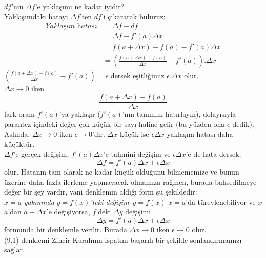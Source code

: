 $df$'nin $\varDelta f$'e yaklaşımı ne kadar iyidir?\\

Yaklaşımdaki hatayı $\varDelta f$'ten $df$'i çıkararak buluruz:
	\begin{equation*}
	\begin{split}
	\textit{Yaklaşım hatası}&= \varDelta f- df\\
	&=\varDelta f-f'(a)\varDelta x\\
	&=f(a+\varDelta x)-f(a)-f'(a)\varDelta x\\
	&=\left( \frac{f(a+\varDelta x)-f(a)}{\varDelta x}-f'(a)\right).\varDelta x
	\end{split}
	\end{equation*}
$\displaystyle \left( \frac{f(a+\varDelta x)-f(a)}{\varDelta x}-f'(a)\right)=\epsilon$ dersek eşitliğimiz $\epsilon.\varDelta x$ olur.\\
$\varDelta x \rightarrow 0$ iken
	\begin{equation*}
	\frac{f(a+ \varDelta x)-f(a)}{\varDelta x}
	\end{equation*}
fark oranı $f'(a)$'ya yaklaşır ($f'(a)$'nın tanımını hatırlayın), dolayısıyla parantez içindeki değer çok küçük bir sayı haline gelir (bu yüzden ona $\epsilon$ dedik). Aslında, $\varDelta x \rightarrow 0$ iken $\epsilon \rightarrow 0$'dır. $\varDelta x$ küçük ise $\epsilon \varDelta x$ yaklaşım hatası daha küçüktür.\\
$\varDelta f$'e gerçek değişim, $f'(a) \varDelta x$'e tahmini değişim ve $\epsilon \varDelta x$'e de hata dersek,
	\begin{equation*}
	\varDelta f = f'(a) \varDelta x + \epsilon \varDelta x
	\end{equation*}
olur. Hatanın tam olarak ne kadar küçük olduğunu bilmememize ve bunun üzerine daha fazla ilerleme yapmayacak olmamıza rağmen, burada bahsedilmeye değer bir şey vardır, yani denklemin aldığı form şu şekildedir:\\

$x=a$ \textit{yakınında} $y=f(x)$\textit{'teki değişim}\
	$y=f(x)$ $x=a$'da türevlenebiliyor ve $x$ $a$'dan $a+\varDelta x$'e değişiyorsa, $f$'deki $\varDelta y$ değişimi
	\begin{equation}
	\varDelta y=f'(a) \varDelta x + \epsilon \varDelta x
	\end{equation}
formunda bir denklemle verilir. Burada $\varDelta x \rightarrow 0$ iken $\epsilon \rightarrow 0$ olur.\\

(9.1) denklemi Zincir Kuralının ispatını başarılı bir şekilde sonlandırmamızı sağlar.


